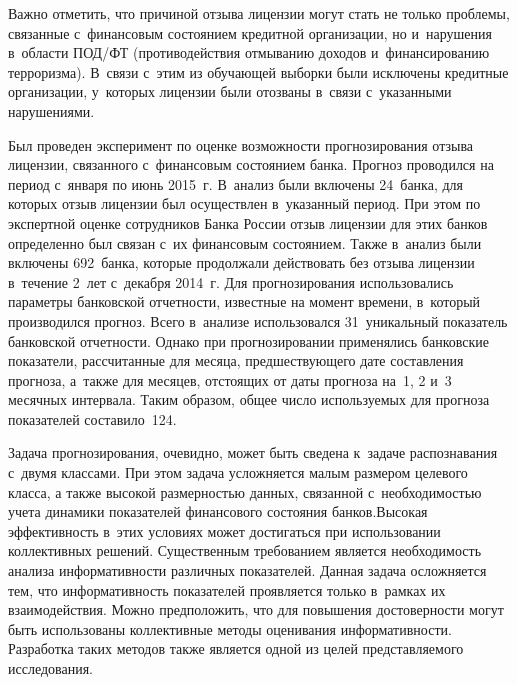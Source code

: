 \begin{multicols}{2}
Важно отметить, что причиной 
отзыва лицензии могут стать не только проблемы, связанные с~финансовым 
состоянием кредитной организации, но и~нарушения в~об\-ласти ПОД/ФТ
(противодействия отмыванию доходов и~финансированию
терроризма). 
В~связи с~этим из обучающей выборки были исключены кредитные 
организации, у~которых лицензии были отозваны в~связи с~указанными 
нарушениями.

      Был проведен эксперимент по оценке возможности прогнозирования 
отзыва лицензии, связанного с~финансовым состоянием банка. Прогноз 
проводился на период с~января по июнь 2015~г. В~анализ были включены 
24~банка, для которых отзыв лицензии был осуществлен в~указанный 
период. При этом по экспертной оценке сотрудников Банка России отзыв 
лицензии для этих банков определенно был связан с~их финансовым 
со\-сто\-яни\-ем. Также в~анализ были включены 692~банка, которые продолжали 
действовать без отзыва лицензии в~течение 2~лет с~декабря 2014~г. Для 
прогнозирования использовались параметры банковской отчетности, 
известные на момент времени, в~который производился прогноз. Всего 
в~анализе использовался 31~уникальный показатель банковской отчетности. 
Однако при прогнозировании применялись банковские показатели, 
рассчитанные для месяца, предшествующего дате составления прогноза, 
а~также для месяцев, отстоящих от даты прогноза на~1, 2 и~3 месячных 
интервала. Таким образом, общее число используемых для прогноза 
показателей составило~124.
      
      Задача прогнозирования, очевидно, может быть сведена к~задаче 
распознавания с~двумя классами. При этом задача усложняется малым 
размером целевого класса, а также высокой размерностью данных, связанной 
с~необходимостью учета динамики показателей финансового состояния 
банков.\linebreak Высокая эффективность в~этих условиях может достигать\-ся при 
использовании коллективных решений. Существенным требованием является 
необходимость анализа информативности различных показателей. Данная 
задача осложняется тем, что информативность показателей проявляется 
только в~рамках их взаимодействия. Можно предположить, что для 
повышения достоверности могут быть использованы коллективные методы 
оценивания информативности. Разработка таких методов также является 
одной из целей представляемого исследования.
      

\end{multicols}
